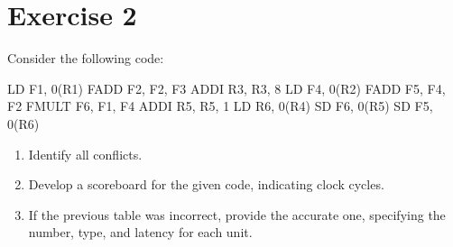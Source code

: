 \section{Exercise 2}

Consider the following code:
\begin{verbnobox}[\verbarg]
LD F1, 0(R1)
FADD F2, F2, F3
ADDI R3, R3, 8
LD F4, 0(R2)
FADD F5, F4, F2
FMULT F6, F1, F4
ADDI R5, R5, 1
LD R6, 0(R4)
SD F6, 0(R5)
SD F5, 0(R6)
\end{verbnobox}
\begin{enumerate}
    \item Identify all conflicts.
    \item Develop a scoreboard for the given code, indicating clock cycles.
    \item If the previous table was incorrect, provide the accurate one, specifying the number, type, and latency for each unit.
\end{enumerate}

